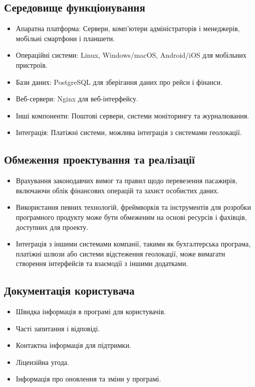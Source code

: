 \documentclass[14pt]{extreport}
\begin{document}
\begin{normalsize}
	\subsection*{Середовище функціонування}
	\begin{itemize}
		\item     Апаратна платформа: Сервери, комп'ютери адміністраторів і менеджерів, мобільні смартфони і планшети.
		\item Операційні системи: Linux, Windows/macOS, Android/iOS для мобільних пристроїв.
		\item Бази даних: PostgreSQL для зберігання даних про рейси і фінанси.
		\item Веб-сервери: Nginx для веб-інтерфейсу.
		\item Інші компоненти: Поштові сервери, системи моніторингу та журналювання.
		\item Інтеграція: Платіжні системи, можлива інтеграція з системами геолокації.
	\end{itemize}
	
	\subsection*{Обмеження проектування та реалізації}
	\begin{itemize}
		\item Врахування законодавчих вимог та правил щодо перевезення пасажирів, включаючи облік фінансових операцій та захист особистих даних.
		\item Використання певних технологій, фреймворків та інструментів для розробки програмного продукту може бути обмеженим на основі ресурсів і фахівців, доступних для проекту.
		\item Інтеграція з іншими системами компанії, такими як бухгалтерська програма, платіжні шлюзи або системи відстеження геолокації, може вимагати створення інтерфейсів та взаємодії з іншими додатками.
	\end{itemize}
	\subsection*{Документація користувача}
	\begin{itemize}
		\item Швидка інформація в програмі для користувачів.
		\item Часті запитання і відповіді.
		\item Контактна інформація для підтримки.
		\item Ліцензійна угода.
		\item Інформація про оновлення та зміни у програмі.
	\end{itemize}
	

\end{normalsize}
\end{document}
